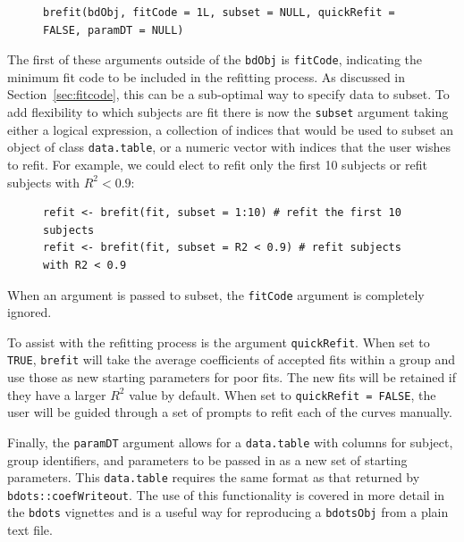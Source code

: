 \documentclass{article}
\newcommand{\xt}{\texttt}%
\begin{document}
\begin{singlespace}
\begin{figure}[H]
\centering
\begin{BVerbatim}
brefit(bdObj, fitCode = 1L, subset = NULL, quickRefit = FALSE, paramDT = NULL)
\end{BVerbatim}
\end{figure}
\end{singlespace}

The first of these arguments outside of the \xt{bdObj} is \xt{fitCode}, indicating the minimum fit code to be included in the refitting process. As discussed in Section~\ref{sec:fitcode}, this can be a sub-optimal way to specify data to subset. To add flexibility to which subjects are fit there is now the \xt{subset} argument taking either a logical expression, a collection of indices that would be used to subset an object of class \xt{data.table}, or a numeric vector with indices that the user wishes to refit. For example, we could elect to refit only the first 10 subjects or refit subjects with $R^2 < 0.9$:

\begin{singlespace}
\begin{figure}[H]
\centering
\begin{BVerbatim}
refit <- brefit(fit, subset = 1:10) # refit the first 10 subjects
refit <- brefit(fit, subset = R2 < 0.9) # refit subjects with R2 < 0.9
\end{BVerbatim}
\end{figure}
\end{singlespace}
When an argument is passed to subset, the \xt{fitCode} argument is completely ignored.

To assist with the refitting process is the argument \xt{quickRefit}. When set to \xt{TRUE}, \xt{brefit} will take the average coefficients of accepted fits within a group and use those as new starting parameters for poor fits. The new fits will be retained if they have a larger $R^2$ value by default. When set to \xt{quickRefit = FALSE}, the user will be guided through a set of prompts to refit each of the curves manually. 

Finally, the \xt{paramDT} argument allows for a \xt{data.table} with columns for subject, group identifiers, and parameters to be passed in as a new set of starting parameters. This \xt{data.table} requires the same format as that returned by \xt{bdots::coefWriteout}. The use of this functionality is covered in more detail in the \xt{bdots} vignettes and is a useful way for reproducing a \xt{bdotsObj} from a plain text file. 
\end{document}
